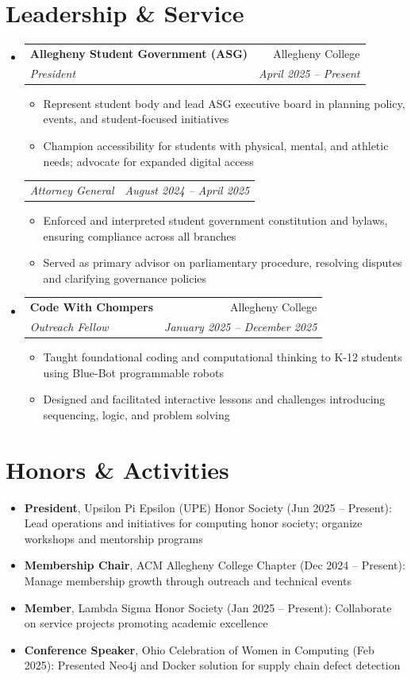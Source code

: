 \documentclass[letterpaper,11pt]{article}
\makeatletter
\newcommand{\resumeItem}[1]{
  \item\small{
    {#1 \vspace{-2pt}}
  }
}
\newcommand{\resumeSubheading}[4]{
  \vspace{-1pt}\item
    \begin{tabular*}{0.97\textwidth}[t]{l@{\extracolsep{\fill}}r}
      \textbf{#1} & #2 \\
      \textit{\small#3} & \textit{\small #4} \\
    \end{tabular*}\vspace{-5pt}
}
\newcommand{\resumeSubSubheading}[2]{
    \begin{tabular*}{0.97\textwidth}{l@{\extracolsep{\fill}}r}
      \textit{\small#1} & \textit{\small #2} \\
    \end{tabular*}\vspace{-5pt}
}
\newcommand{\resumeSubItem}[1]{\resumeItem{#1}\vspace{-4pt}}
\newcommand{\resumeSubHeadingListStart}{\begin{itemize}[leftmargin=*]}
\newcommand{\resumeSubHeadingListEnd}{\end{itemize}}
\newcommand{\resumeItemListStart}{\begin{itemize}}
\newcommand{\resumeItemListEnd}{\end{itemize}\vspace{-5pt}}
\makeatother
\begin{document}
\section{Leadership \& Service}
  \resumeSubHeadingListStart
    \resumeSubheading
      {Allegheny Student Government (ASG)}{Allegheny College}
      {President}{April 2025 -- Present}
      \resumeItemListStart
        \resumeItem{Represent student body and lead ASG executive board in planning policy, events, and student-focused initiatives}
        \resumeItem{Champion accessibility for students with physical, mental, and athletic needs; advocate for expanded digital access}
      \resumeItemListEnd
    \resumeSubSubheading
      {Attorney General}{August 2024 -- April 2025}
      \resumeItemListStart
        \resumeItem{Enforced and interpreted student government constitution and bylaws, ensuring compliance across all branches}
        \resumeItem{Served as primary advisor on parliamentary procedure, resolving disputes and clarifying governance policies}
      \resumeItemListEnd
    
    \resumeSubheading
      {Code With Chompers}{Allegheny College}
      {Outreach Fellow}{January 2025 -- December 2025}
      \resumeItemListStart
        \resumeItem{Taught foundational coding and computational thinking to K-12 students using Blue-Bot programmable robots}
        \resumeItem{Designed and facilitated interactive lessons and challenges introducing sequencing, logic, and problem solving}
      \resumeItemListEnd

  \resumeSubHeadingListEnd


\section{Honors \& Activities}
  \resumeSubHeadingListStart
    \resumeSubItem{\textbf{President}, Upsilon Pi Epsilon (UPE) Honor Society (Jun 2025 -- Present): Lead operations and initiatives for computing honor society; organize workshops and mentorship programs}
    \resumeSubItem{\textbf{Membership Chair}, ACM Allegheny College Chapter (Dec 2024 -- Present): Manage membership growth through outreach and technical events}
    \resumeSubItem{\textbf{Member}, Lambda Sigma Honor Society (Jan 2025 -- Present): Collaborate on service projects promoting academic excellence}
    \resumeSubItem{\textbf{Conference Speaker}, Ohio Celebration of Women in Computing (Feb 2025): Presented Neo4j and Docker solution for supply chain defect detection}
  \resumeSubHeadingListEnd


\end{document}
